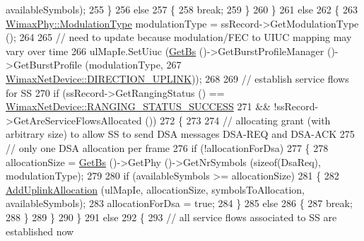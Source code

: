 \begin{DoxyCode}
      availableSymbols);
255             \}
256           \textcolor{keywordflow}{else}
257             \{
258               \textcolor{keywordflow}{break};
259             \}
260         \}
261       \textcolor{keywordflow}{else}
262         \{
263           \hyperlink{classns3_1_1WimaxPhy_a044c5d8a48ca992c39c2a946f6e755fa}{WimaxPhy::ModulationType} modulationType = ssRecord->GetModulationType ();
264 
265           \textcolor{comment}{// need to update because modulation/FEC to UIUC mapping may vary over time}
266           ulMapIe.SetUiuc (\hyperlink{classns3_1_1UplinkScheduler_afe61b7de71d92d2dff1b135744a6ff7e}{GetBs} ()->GetBurstProfileManager ()->GetBurstProfile (modulationType,
267                                                                                  
      \hyperlink{classns3_1_1WimaxNetDevice_a194b6cf7eb59582328eb2531dc9ed884ad37a477621d1df190ff8d8fb933349cd}{WimaxNetDevice::DIRECTION\_UPLINK}));
268 
269           \textcolor{comment}{// establish service flows for SS}
270           \textcolor{keywordflow}{if} (ssRecord->GetRangingStatus () == 
      \hyperlink{classns3_1_1WimaxNetDevice_a2a74c0f01e51abc1851a630242e7b591a2a48f503c20971a1a5901af0b6d0746c}{WimaxNetDevice::RANGING\_STATUS\_SUCCESS}
271               && !ssRecord->GetAreServiceFlowsAllocated ())
272             \{
273 
274               \textcolor{comment}{// allocating grant (with arbitrary size) to allow SS to send DSA messages DSA-REQ and
       DSA-ACK}
275               \textcolor{comment}{// only one DSA allocation per frame}
276               \textcolor{keywordflow}{if} (!allocationForDsa)
277                 \{
278                   allocationSize = \hyperlink{classns3_1_1UplinkScheduler_afe61b7de71d92d2dff1b135744a6ff7e}{GetBs} ()->GetPhy ()->GetNrSymbols (\textcolor{keyword}{sizeof}(DsaReq), modulationType);
279 
280                   \textcolor{keywordflow}{if} (availableSymbols >= allocationSize)
281                     \{
282                       \hyperlink{classns3_1_1UplinkSchedulerMBQoS_a23b74ad65ec3d22b55d25648addd7486}{AddUplinkAllocation} (ulMapIe, allocationSize, symbolsToAllocation,
       availableSymbols);
283                       allocationForDsa = \textcolor{keyword}{true};
284                     \}
285                   \textcolor{keywordflow}{else}
286                     \{
287                       \textcolor{keywordflow}{break};
288                     \}
289                 \}
290             \}
291           \textcolor{keywordflow}{else}
292             \{
293               \textcolor{comment}{// all service flows associated to SS are established now}

\end{DoxyCode}
